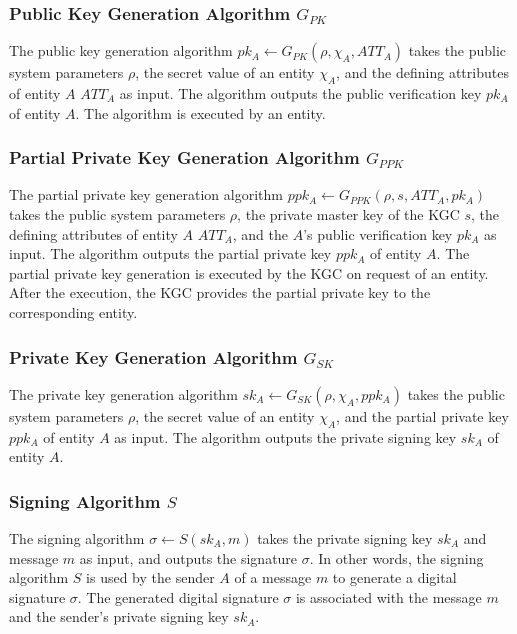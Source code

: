 \subsubsection{Public Key Generation Algorithm $G_{PK}$}
The public key generation algorithm $pk_A \leftarrow G_{PK}(\rho, \chi_A, ATT_A)$ takes the public system parameters $\rho$, the secret value of an entity $\chi_A$, and the defining attributes of entity $A$ $ATT_A$ as input.
The algorithm outputs the public verification key $pk_A$ of entity $A$.
The algorithm is executed by an entity.

\subsubsection{Partial Private Key Generation Algorithm $G_{PPK}$}
The partial private key generation algorithm $ppk_A \leftarrow G_{PPK}(\rho, s, ATT_A, pk_A)$ takes the public system parameters $\rho$, the private master key of the KGC $s$, the defining attributes of entity $A$ $ATT_A$, and the $A$'s public verification key $pk_A$ as input.
The algorithm outputs the partial private key $ppk_A$ of entity $A$.
The partial private key generation is executed by the KGC on request of an entity.
After the execution, the KGC provides the partial private key to the corresponding entity.

\subsubsection{Private Key Generation Algorithm $G_{SK}$}
The private key generation algorithm $sk_A \leftarrow G_{SK}(\rho, \chi_A, ppk_A)$ takes the public system parameters $\rho$, the secret value of an entity $\chi_A$, and the partial private key $ppk_A$ of entity $A$ as input.
The algorithm outputs the private signing key $sk_A$ of entity $A$.

\subsubsection{Signing Algorithm $S$}
The signing algorithm $\sigma \leftarrow S(sk_A, m)$ takes the private signing key $sk_A$ and message $m$ as input, and outputs the signature $\sigma$.
In other words, the signing algorithm $S$ is used by the sender $A$ of a message $m$ to generate a digital signature $\sigma$.
The generated digital signature $\sigma$ is associated with the message $m$ and the sender's private signing key $sk_A$.


